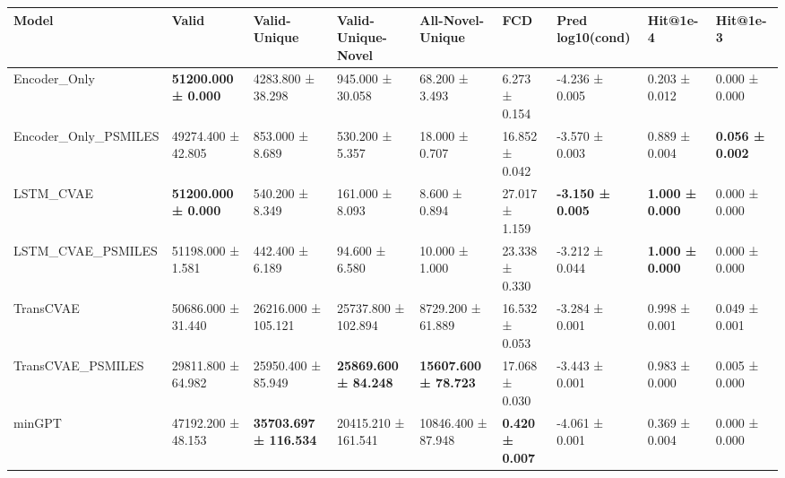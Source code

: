 \begin{tabular}{lllllllll}
\toprule
Model & Valid & Valid-Unique & Valid-Unique-Novel & All-Novel-Unique & FCD & Pred log10(cond) & Hit@1e-4 & Hit@1e-3 \\
\midrule
Encoder_Only & \textbf{51200.000 ± 0.000} & 4283.800 ± 38.298 & 945.000 ± 30.058 & 68.200 ± 3.493 & 6.273 ± 0.154 & -4.236 ± 0.005 & 0.203 ± 0.012 & 0.000 ± 0.000 \\
Encoder_Only_PSMILES & 49274.400 ± 42.805 & 853.000 ± 8.689 & 530.200 ± 5.357 & 18.000 ± 0.707 & 16.852 ± 0.042 & -3.570 ± 0.003 & 0.889 ± 0.004 & \textbf{0.056 ± 0.002} \\
LSTM_CVAE & \textbf{51200.000 ± 0.000} & 540.200 ± 8.349 & 161.000 ± 8.093 & 8.600 ± 0.894 & 27.017 ± 1.159 & \textbf{-3.150 ± 0.005} & \textbf{1.000 ± 0.000} & 0.000 ± 0.000 \\
LSTM_CVAE_PSMILES & 51198.000 ± 1.581 & 442.400 ± 6.189 & 94.600 ± 6.580 & 10.000 ± 1.000 & 23.338 ± 0.330 & -3.212 ± 0.044 & \textbf{1.000 ± 0.000} & 0.000 ± 0.000 \\
TransCVAE & 50686.000 ± 31.440 & 26216.000 ± 105.121 & 25737.800 ± 102.894 & 8729.200 ± 61.889 & 16.532 ± 0.053 & -3.284 ± 0.001 & 0.998 ± 0.001 & 0.049 ± 0.001 \\
TransCVAE_PSMILES & 29811.800 ± 64.982 & 25950.400 ± 85.949 & \textbf{25869.600 ± 84.248} & \textbf{15607.600 ± 78.723} & 17.068 ± 0.030 & -3.443 ± 0.001 & 0.983 ± 0.000 & 0.005 ± 0.000 \\
minGPT & 47192.200 ± 48.153 & \textbf{35703.697 ± 116.534} & 20415.210 ± 161.541 & 10846.400 ± 87.948 & \textbf{0.420 ± 0.007} & -4.061 ± 0.001 & 0.369 ± 0.004 & 0.000 ± 0.000 \\
\bottomrule
\end{tabular}
